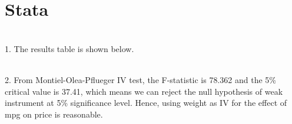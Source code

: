 \documentclass{article}
\begin{document}
\section{Stata}
~\\
1. The results table is shown below. 
\begin{table}[H]
\centering

\end{table}

~\\
2. From Montiel-Olea-Pflueger IV test, the F-statistic is 78.362 and the 5\% critical value  is 37.41, which means we can reject the null hypothesis of weak instrument at 5\% significance level. Hence, using weight as IV for the effect of mpg on price is reasonable. 
\end{document}
